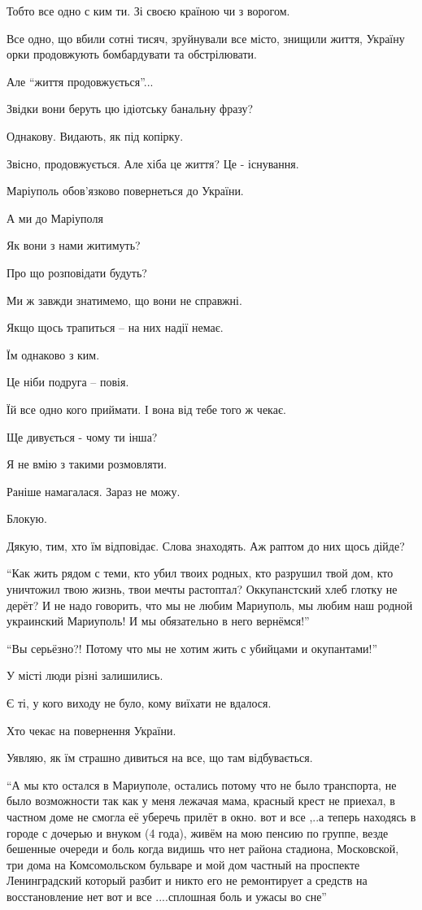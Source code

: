 Тобто все одно с ким ти. Зі своєю країною чи з ворогом. 

Все одно, що вбили сотні тисяч, зруйнували все місто, знищили життя, Україну
орки продовжують бомбардувати та обстрілювати.

Але  \enquote{життя продовжується}...

Звідки вони беруть цю ідіотську банальну фразу?

Однакову. Видають, як під копірку.

Звісно, продовжується. Але хіба це життя? Це  -  існування.

Маріуполь обов'язково повернеться до України.

А ми до Маріуполя 

Як вони з нами житимуть?

Про що  розповідати будуть?

Ми ж завжди знатимемо, що вони не справжні.

Якщо щось трапиться – на них надії немає.

Їм однаково з ким.

Це ніби подруга – повія.

Їй все одно кого приймати.  І вона від тебе того ж чекає.

Ще дивується - чому ти інша? 

Я не вмію з такими  розмовляти. 

Раніше намагалася. Зараз не можу.

Блокую.

Дякую, тим, хто їм відповідає. Слова знаходять. Аж раптом до них щось дійде?

\enquote{Как жить рядом с теми, кто убил твоих родных, кто разрушил твой дом, кто
уничтожил твою жизнь, твои мечты растоптал? Оккупанстский хлеб глотку не дерёт?
И не надо говорить, что мы не любим Мариуполь, мы любим наш родной украинский
Мариуполь! И мы обязательно в него вернёмся!}

\enquote{Вы серьёзно?! Потому что мы не хотим жить с убийцами и окупантами!}

У місті люди різні залишились.

Є ті, у кого виходу не було, кому виїхати не вдалося. 

Хто чекає на повернення України. 

Уявляю, як їм страшно  дивиться на все, що там відбувається.

\enquote{А мы кто остался в Мариуполе, остались потому что не было транспорта,
не было возможности так как у меня лежачая мама, красный крест не приехал, в
частном доме не смогла её уберечь прилёт в окно. вот и все ,..а теперь находясь
в городе с дочерью и внуком (4 года), живём на мою пенсию по группе, везде
бешенные очереди и боль когда видишь что нет района стадиона, Московской, три
дома на Комсомольском бульваре и мой дом частный  на проспекте Ленинградский
который разбит и никто его не ремонтирует а средств на восстановление нет вот и
все ....сплошная боль и ужасы во сне}

